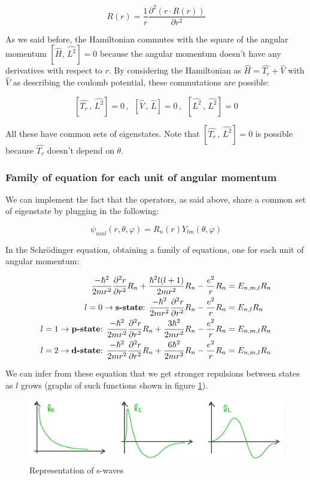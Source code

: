 		$$R(r)=\frac{1}{r}\frac{\partial^2(r\cdot R(r))}{\partial r^2}$$

		As we said before, the Hamiltonian commutes with the square of the angular momentum $[\hat{H},\,\hat{L^2}]=0$ because the angular momentum doesn't have any derivatives with respect to $r$.
		By considering the Hamiltonian as $\hat{H}=\hat{T_r}+\hat{V}$ with $\hat{V}$ as describing the coulomb potential, these commutations are possible:

		$$[\hat{T_r}\,,\,\hat{L^2}]=0\,,\,\,\,[\hat{V}\,,\,\hat{L}]=0\,,\,\,\,[\hat{L^2}\,,\,\hat{L^2}]=0$$

		All these have common sets of eigenstates.
		Note that $[\hat{T_r}\,,\,\hat{L^2}]=0$ is possible because $\hat{T_r}$ doesn't depend on $\theta$.

		\subsubsection{Family of equation for each unit of angular momentum}
		We can implement the fact that the operators, as said above, share a common set of eigenstate by plugging in the following:

		$$\psi_{nml}(r, \theta, \varphi) = R_n(r)Y_{lm}(\theta, \varphi)$$

		In the Schr\"odinger equation, obtaining a family of equations, one for each unit of angular momentum:

		\begin{align*}
			\frac{-\hbar^2}{2mr^2}\frac{\partial^2r}{\partial r^2}R_n+\frac{\hbar^2l(l+1)}{2mr^2}R_n-\frac{e^2}{r}R_n&=E_{n,m,l}R_n\\
			l=0 \rightarrow \text{\textbf{s-state}: } \frac{-\hbar^2}{2mr^2}\frac{\partial^2r}{\partial r^2}R_n-\frac{e^2}{r}R_n&=E_{n,l}R_n\\
			l=1 \rightarrow \text{\textbf{p-state}: }\frac{-\hbar^2}{2mr^2}\frac{\partial^2r}{\partial r^2}R_n+\frac{3\hbar^2}{2mr^2}R_n-\frac{e^2}{r}R_n&=E_{n,m,l}R_n\\
			l=2 \rightarrow \text{\textbf{d-state}: }\frac{-\hbar^2}{2mr^2}\frac{\partial^2r}{\partial r^2}R_n+\frac{6\hbar^2}{2mr^2}R_n-\frac{e^2}{r}R_n&=E_{n,m,l}R_n
		\end{align*}

		We can infer from these equation that we get stronger repulsions between states as $l$ grows (graphs of such functions shown in figure \ref{fig_swaves}).

		\begin{figure}[htbp!]
 			\centering
 			\includegraphics[scale=0.30]{img_5}
 			\caption{Representation of s-waves}
 			\label{fig_swaves}
		\end{figure}

